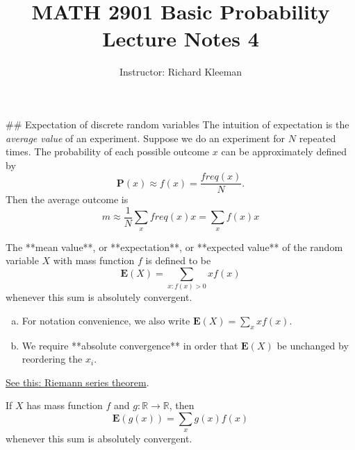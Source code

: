 


\title{MATH 2901 Basic Probability Lecture Notes 4}
\author{Instructor: Richard Kleeman}
\date{}
\maketitle


## Expectation of discrete random variables
The intuition of expectation is the \emph{average value} of an experiment. Suppose we do an experiment for $N$ repeated times. The probability of each possible outcome $x$ can be approximately defined by 
\begin{equation*}
    \mathbf{P}(x) \approx f(x) = \frac{freq(x)}{N}.
\end{equation*}
Then the average outcome is
\begin{equation*}
    m \approx \frac{1}{N}\sum_{x} freq(x)x = \sum_x f(x)x
\end{equation*}

\begin{definition}
The **mean value**, or **expectation**, or **expected value** of the random variable $X$ with mass function $f$ is defined to be 
\begin{equation*}
    \mathbf{E}(X) = \sum_{x:f(x)>0} xf(x)
\end{equation*}
whenever this sum is absolutely convergent.
\end{definition}

\begin{remark}
\begin{enumerate}[(a)]
    \item For notation convenience, we also write $\mathbf{E}(X) = \sum_x xf(x)$.
    \item We require **absolute convergence** in order that $\mathbf{E}(X)$ be unchanged by reordering the $x_i$. 
\end{enumerate}
\end{remark}

\begin{theorem} \href{https://en.wikipedia.org/wiki/Riemann_series_theorem}{See this: Riemann series theorem}.
\end{theorem}

\begin{lemma}
If $X$ has mass function $f$ and $g:\mathbb{R}\to\mathbb{R}$, then
\begin{equation*}
    \mathbf{E}(g(x)) = \sum_x g(x) f(x)
\end{equation*}
whenever this sum is absolutely convergent.
\end{lemma}

